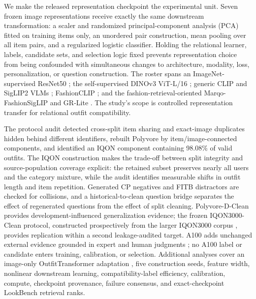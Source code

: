 \documentclass[preprint,12pt]{elsarticle}
\begin{document}
We make the released representation checkpoint the experimental unit. Seven frozen image representations receive exactly the same downstream transformation: a scaler and randomized principal-component analysis (PCA) fitted on training items only, an unordered pair construction, mean pooling over all item pairs, and a regularized logistic classifier. Holding the relational learner, labels, candidate sets, and selection logic fixed prevents representation choice from being confounded with simultaneous changes to architecture, modality, loss, personalization, or question construction. The roster spans an ImageNet-supervised ResNet50 \cite{deng2009imagenet,he2016resnet}; the self-supervised DINOv3 ViT-L/16 \cite{caron2021dino,oquab2024dinov2,simeoni2025dinov3}; generic CLIP and SigLIP2 VLMs \cite{radford2021clip,zhai2023siglip,tschannen2025siglip2}; FashionCLIP \cite{chia2022fashionclip}; and the fashion-retrieval-oriented Marqo-FashionSigLIP and GR-Lite \cite{zhu2025gcl,marqo2024fashionsiglip,gao2026lookbench}. The study's scope is controlled representation transfer for relational outfit compatibility.

The protocol audit detected cross-split item sharing and exact-image duplicates hidden behind different identifiers, rebuilt Polyvore by item/image-connected components, and identified an IQON component containing 98.08\% of valid outfits. The IQON construction makes the trade-off between split integrity and source-population coverage explicit: the retained subset preserves nearly all users and the category mixture, while the audit identifies measurable shifts in outfit length and item repetition. Generated CP negatives and FITB distractors are checked for collisions, and a historical-to-clean question bridge separates the effect of regenerated questions from the effect of split cleaning. Polyvore-D-Clean provides development-influenced generalization evidence; the frozen IQON3000-Clean protocol, constructed prospectively from the larger IQON3000 corpus \cite{nakamura2018iqon}, provides replication within a second leakage-audited target. A100 adds unchanged external evidence grounded in expert and human judgments \cite{zou2022a100}; no A100 label or candidate enters training, calibration, or selection. Additional analyses cover an image-only OutfitTransformer adaptation \cite{sarkar2023outfittransformer}, five construction seeds, feature width, nonlinear downstream learning, compatibility-label efficiency, calibration, compute, checkpoint provenance, failure consensus, and exact-checkpoint LookBench retrieval ranks.
\end{document}
